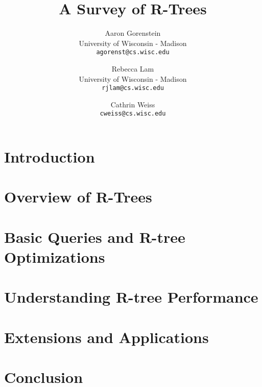 \documentclass[10pt, twocolumn]{article}
\title{A Survey of R-Trees}
\author{
	Aaron Gorenstein\\
	University of Wisconsin - Madison\\
	\texttt{agorenst@cs.wisc.edu}
	\and
	Rebecca Lam\\
	University of Wisconsin - Madison\\
	\texttt{rjlam@cs.wisc.edu}
	\and
	Cathrin Weiss\\
	\texttt{cweiss@cs.wisc.edu}
}
\begin{document}
\newcommand{\rbase}{R}
\newcommand{\rstar}{$\text{R}^*$}
\newcommand{\rplus}{$\text{R}^+$}

\maketitle
\thispagestyle{empty}



\section{Introduction}
\label{sec:intro}


\section{Overview of R-Trees}
\label{sec:overview}


\section{Basic Queries and R-tree Optimizations}
\label{sec:impchal}


\section{Understanding R-tree Performance}
\label{sec:dbchal}


\section{Extensions and Applications}
\label{sec:apps}


\section{Conclusion}
\label{sec:conc}




\end{document}
